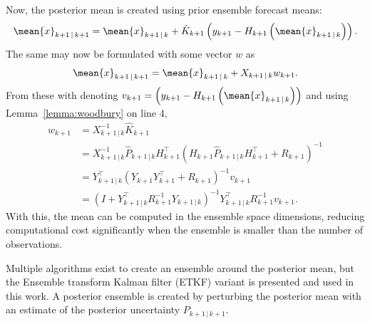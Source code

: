 Now, the posterior mean is created using prior ensemble forecast means:
\begin{equation*}
    \mean{x}_{k+1\,\vert\,k+1} = \mean{x}_{k+1\,\vert\,k} + \hat{K}_{k+1}\left(y_{k+1} - H_{k+1}\left(\mean{x}_{k+1\,\vert\,k}\right) \right).
\end{equation*}
The same may now be formulated with some vector $w$ as 
\begin{equation*}
    \mean{x}_{k+1\,\vert\,k+1} = \mean{x}_{k+1\,\vert\,k} + X_{k+1 \, \vert \, k} w_{k+1}.
\end{equation*}
From these with denoting $v_{k+1}= \left(y_{k+1} - H_{k+1}\left(\mean{x}_{k+1\,\vert\,k}\right) \right)$ and using Lemma~\ref{lemma:woodbury} on line 4,
\begin{subequations}
    \begin{align*}
        w_{k+1} &= X_{k+1 \, \vert \, k}^{-1} \hat{K}_{k+1}\\
                &= X_{k+1 \, \vert \, k}^{-1} \hat{P}_{k+1\,\vert\,k} H_{k+1}^{\top} (H_{k+1}\hat{P}_{k+1\,\vert\,k}H_{k+1}^{\top} + R_{k+1})^{-1}\\
                &= Y_{k+1 \, \vert \, k}^{\top}(Y_{k+1} Y_{k+1}^{\top} + R_{k+1})^{-1} v_{k+1}\\
                &= (I + Y_{k+1 \, \vert \, k}^{\top} R_{k+1}^{-1} Y_{k+1 \, \vert \, k})^{-1} Y_{k+1 \, \vert \, k}^{\top} R_{k+1}^{-1}  v_{k+1}.
    \end{align*}
\end{subequations}
With this, the mean can be computed in the ensemble space dimensions, reducing computational cost significantly when the ensemble is smaller than the number of observations.

Multiple algorithms exist to create an ensemble around the posterior mean, but the Ensemble transform Kalman filter (ETKF) variant is presented and used in this work.
A posterior ensemble is created by perturbing the posterior mean with an estimate of the posterior uncertainty $P_{k+1\,\vert\,k+1}$.

